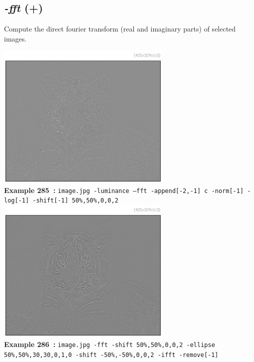 \documentclass[a4paper,11pt,twoside]{book}
\begin{document}
\subsection{\emph{-fft} (+)}\vspace*{-0.5em}
Compute the direct fourier transform (real and imaginary parts) of selected images.
\begin{center}\includegraphics[keepaspectratio=true,height=7cm,width=\textwidth]{img/gmic_def285.jpg}\\
{\footnotesize \textbf{Example 285~:} \texttt{image.jpg -luminance --fft -append[-2,-1] c -norm[-1] -log[-1] -shift[-1] 50\%,50\%,0,0,2}}
\\\includegraphics[keepaspectratio=true,height=7cm,width=\textwidth]{img/gmic_def286.jpg}\\
{\footnotesize \textbf{Example 286~:} \texttt{image.jpg -fft -shift 50\%,50\%,0,0,2 -ellipse 50\%,50\%,30,30,0,1,0 -shift -50\%,-50\%,0,0,2 -ifft -remove[-1]}}
\end{center}
\end{document}

